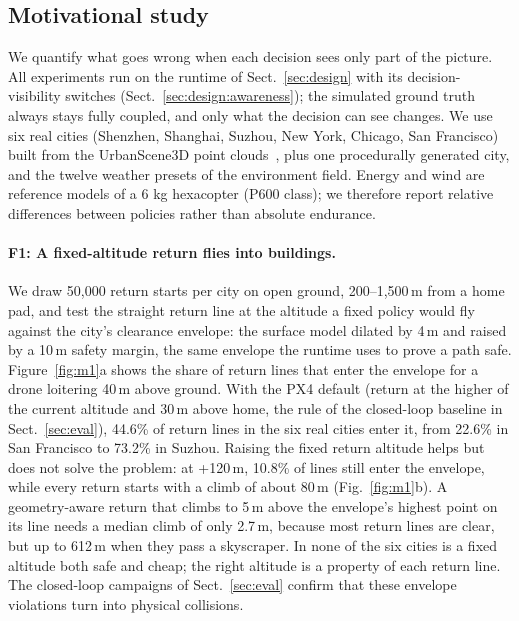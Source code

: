 \subsection{Motivational study}\label{sec:bg:study}

We quantify what goes wrong when each decision sees only part of the picture. All experiments run on the runtime of
Sect.~\ref{sec:design} with its decision-visibility switches (Sect.~\ref{sec:design:awareness}); the simulated ground
truth always stays fully coupled, and only what the decision can see changes. We use six real cities (Shenzhen,
Shanghai, Suzhou, New York, Chicago, San Francisco) built from the UrbanScene3D point clouds~\cite{lin2022urbanscene3d},
plus one procedurally generated city, and the twelve weather presets of the environment field. Energy and wind are reference models
of a 6 kg hexacopter (P600 class); we therefore report relative differences between policies rather than absolute
endurance.

\paragraph{F1: A fixed-altitude return flies into buildings.}
We draw 50,000 return starts per city on open ground, 200--1,500\,m from a home pad, and test the straight return line
at the altitude a fixed policy would fly against the city's clearance envelope: the surface model dilated by 4\,m and
raised by a 10\,m safety margin, the same envelope the runtime uses to prove a path safe. Figure~\ref{fig:m1}a shows
the share of return lines that enter the envelope for a drone loitering 40\,m above ground. With the PX4 default
(return at the higher of the current altitude and 30\,m above home, the rule of the closed-loop baseline in
Sect.~\ref{sec:eval}), 44.6\% of return lines in the six real cities enter it, from 22.6\% in San Francisco to
73.2\% in Suzhou. Raising the fixed return altitude helps but does not solve the problem: at +120\,m, 10.8\% of lines
still enter the envelope, while every return starts with a climb of about 80\,m (Fig.~\ref{fig:m1}b). A
geometry-aware return that climbs to 5\,m above the envelope's highest point on its line needs a median climb of only
2.7\,m, because most return lines are clear, but up to 612\,m when they pass a skyscraper. In none of the six cities is a
fixed altitude both safe and cheap; the right altitude is a property of each return line. The closed-loop campaigns of
Sect.~\ref{sec:eval} confirm that these envelope violations turn into physical collisions.

